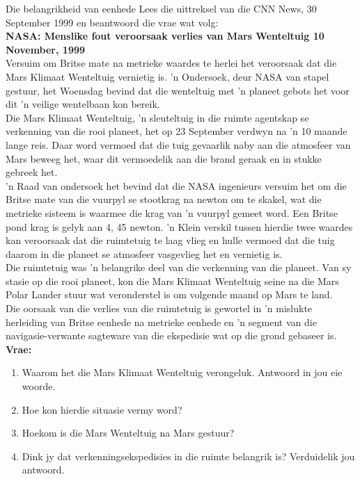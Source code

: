 \begin{casestudy}{Die belangrikheid van eenhede}
            \nopagebreak
Lees die uittreksel van die CNN News, 30 September 1999 en beantwoord die vrae wat volg:\\
\textbf{NASA: Menslike fout veroorsaak verlies van Mars Wenteltuig 10 November, 1999}\\
Versuim om Britse mate na metrieke waardes te herlei het veroorsaak dat die Mars Klimaat Wenteltuig vernietig is.  'n Ondersoek, deur NASA van stapel gestuur, het Woensdag bevind dat die wenteltuig met  'n planeet gebots het voor dit  'n veilige wentelbaan kon bereik.\\
Die Mars Klimaat Wenteltuig,  'n sleuteltuig in die ruimte agentskap se verkenning van die rooi planeet, het op 23 September verdwyn na  'n 10 maande lange reis. Daar word vermoed dat die tuig gevaarlik naby aan die atmosfeer van Mars beweeg het, waar dit vermoedelik aan die brand geraak en in stukke gebreek het.\\
 'n Raad van ondersoek het bevind dat die NASA ingenieurs versuim het om die Britse mate van die vuurpyl se stootkrag na newton om te skakel, wat die metrieke sisteem is waarmee die krag van  'n vuurpyl gemeet word. Een Britse pond krag is gelyk aan 4, 45 newton.  'n Klein verskil tussen hierdie twee waardes kan veroorsaak dat die ruimtetuig te laag vlieg en hulle vermoed dat die tuig daarom in die planeet se atmosfeer vasgevlieg het en vernietig is.\\
Die ruimtetuig was  'n belangrike deel van die verkenning van die planeet. Van sy stasie op die rooi planeet, kon die Mars Klimaat Wenteltuig seine na die Mars Polar Lander stuur wat veronderstel is om volgende maand op Mars te land.\\
Die oorsaak van die verlies van die ruimtetuig is gewortel in  'n mislukte herleiding van Britse eenhede na metrieke eenhede en  'n segment van die navigasie-verwante sagteware van die ekspedisie wat op die grond gebaseer is.\\
\textbf{Vrae:}\\
\begin{enumerate}[noitemsep, label=\textbf{\arabic*}. ] 
\item Waarom het die Mars Klimaat Wenteltuig verongeluk. Antwoord in  jou eie woorde.
\item Hoe kon hierdie situasie vermy word?
\item Hoekom is die Mars Wenteltuig na Mars gestuur?
\item Dink jy dat verkenningsekspedisies in die ruimte belangrik is? Verduidelik jou antwoord.
\end{enumerate}
\end{casestudy}
